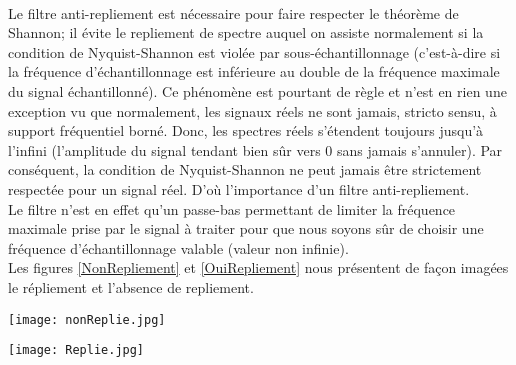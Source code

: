 \paragraph{}
Le filtre anti-repliement est nécessaire pour faire respecter le théorème de Shannon; il évite le repliement de spectre auquel on assiste normalement si la condition de Nyquist-Shannon est violée par sous-échantillonnage (c'est-à-dire si la fréquence d'échantillonnage est inférieure au double de la fréquence maximale du signal échantillonné). Ce phénomène est pourtant de règle et n'est en rien une exception vu que normalement, les signaux réels ne sont jamais, stricto sensu, à support fréquentiel borné. Donc, les spectres réels s'étendent toujours jusqu'à l'infini (l'amplitude du signal tendant bien sûr vers $ 0 $ sans jamais s'annuler). Par conséquent, la condition de Nyquist-Shannon ne peut jamais être strictement respectée pour un signal réel. D'où l'importance d'un filtre anti-repliement.\\
Le filtre n'est en effet qu'un passe-bas permettant de limiter la fréquence maximale prise par le signal à traiter pour que nous soyons sûr de choisir une fréquence d'échantillonnage valable (valeur non infinie).\\
Les figures \ref{NonRepliement} et \ref{OuiRepliement} nous présentent de façon imagées le répliement et l'absence de repliement.\newpage
\begin{center}
\texttt{[image: nonReplie.jpg]}
\label{NonRepliement}
\end{center}
\begin{center}
\texttt{[image: Replie.jpg]}
\label{OuiRepliement}
\end{center}
